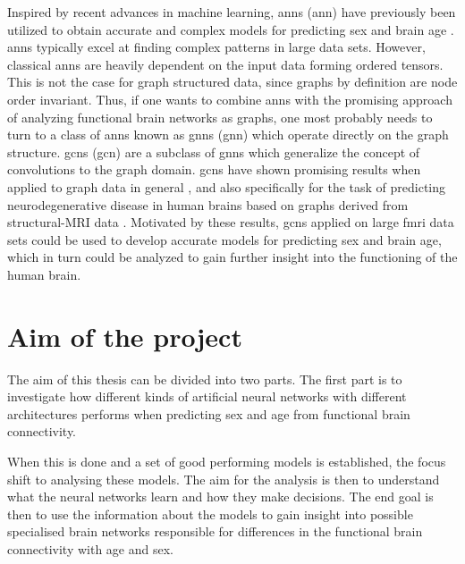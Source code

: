Inspired by recent advances in machine learning, \acrlong{ann}s (\acrshort{ann}) have previously been utilized to obtain accurate and complex models for predicting sex and brain age \cite{amoroso_multiplex_age, stankeviciute, arslan}. \acrshort{ann}s typically excel at finding complex patterns in large data sets. However, classical \acrshort{ann}s are heavily dependent on the input data forming ordered tensors. This is not the case for graph structured data, since graphs by definition are node order invariant. Thus, if one wants to combine \acrshort{ann}s with the promising approach of analyzing functional brain networks as graphs, one most probably needs to turn to a class of \acrshort{ann}s known as \acrlong{gnn}s (\acrshort{gnn}) which operate directly on the graph structure. \acrlong{gcn}s (\acrshort{gcn}) are a subclass of \acrshort{gnn}s which generalize the concept of convolutions to the graph domain. \acrshort{gcn}s have shown promising results when applied to graph data in general \cite{kipf_semi_supervised, kipf_vae, wu_review}, and also specifically for the task of predicting neurodegenerative disease in human brains based on graphs derived from structural-MRI data \cite{jansson_sandstrom}. Motivated by these results, \acrshort{gcn}s applied on large \acrshort{fmri} data sets could be used to develop accurate models for predicting sex and brain age, which in turn could be analyzed to gain further insight into the functioning of the human brain.




\section{Aim of the project}
The aim of this thesis can be divided into two parts. The first part is to investigate how different kinds of artificial neural networks with different architectures performs when predicting sex and age from functional brain connectivity.

When this is done and a set of good performing models is established, the focus shift to analysing these models. The aim for the analysis is then to understand what the neural networks learn and how they make decisions. The end goal is then to use the information about the models to gain insight into possible specialised brain networks responsible for differences in the functional brain connectivity with age and sex.

